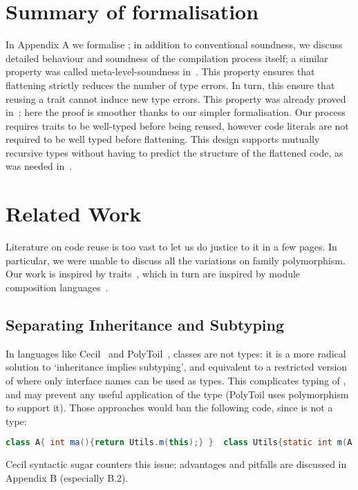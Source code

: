 \saveSpace
\section{Summary of formalisation}
\saveSpace
In Appendix A we formalise \name; in addition to conventional soundness, we 
discuss detailed behaviour and soundness
of the compilation process itself;
a similar property was called meta-level-soundness in~\cite{servetto2014meta}.
This property ensures that flattening strictly reduces the number of type errors.
In turn, this
ensure that reusing a trait cannot induce new type errors.
This property was already proved in~\cite{servetto2014meta}; here
the proof is smoother thanks to our simpler formalisation.
Our process requires traits to be well-typed before being reused,
however code literals are not required to be well typed before flattening.
This design supports mutually recursive types without having to
predict the structure of the flattened code, as was
needed in~\cite{deep}.

\saveSpace
\section{Related Work}
\saveSpace
Literature on code reuse is too vast to let us do justice to it in a few pages.
In particular, we were unable to discuss all the variations on family polymorphism.
Our work is inspired by traits~\cite{ducasse2006traits}, which in turn
are inspired by module composition languages~\cite{ancona2002calculus}.

\subsection{Separating Inheritance and Subtyping}
In languages like Cecil~\cite{chambers1995typechecking} and PolyToil~\cite{bruce1995polytoil},
classes are not types: it is a more radical solution to `inheritance implies subtyping', and equivalent to a restricted version of \name where only interface names can be used as types.
This complicates typing of \Q@this@,
and may prevent any useful application of the \Q@This@ type (PolyToil uses polymorphism to support it).
Those approaches would ban the following code,
since \Q@A@ is not a type:
\saveSpace\saveSpace\begin{lstlisting}[language=Java]
class A{ int ma(){return Utils.m(this);} }  class Utils{static int m(A a){..}}
\end{lstlisting}\saveSpace\saveSpace
Cecil syntactic sugar counters this issue; advantages and pitfalls are
discussed in Appendix B (especially B.2).

